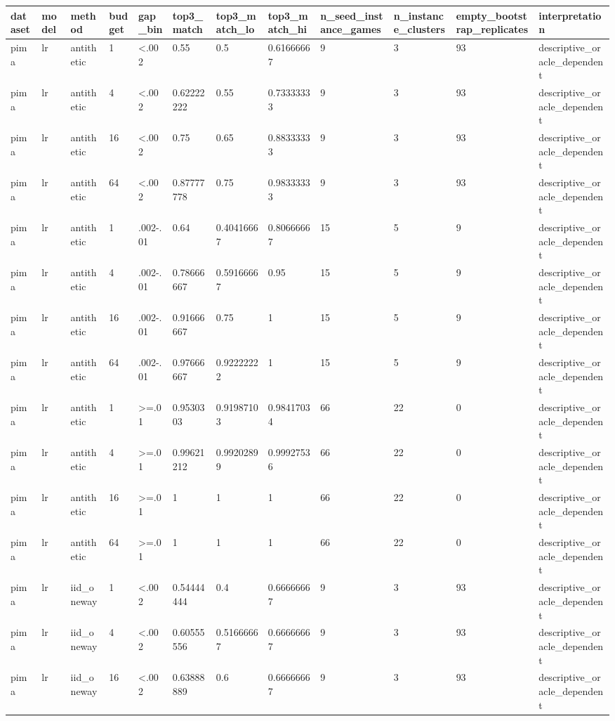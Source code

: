 \begin{tabular}{llllllllllll}
\toprule
dataset & model & method & budget & gap\_bin & top3\_match & top3\_match\_lo & top3\_match\_hi & n\_seed\_instance\_games & n\_instance\_clusters & empty\_bootstrap\_replicates & interpretation \\
\midrule
pima & lr & antithetic & 1 & <.002 & 0.55 & 0.5 & 0.61666667 & 9 & 3 & 93 & descriptive\_oracle\_dependent \\
pima & lr & antithetic & 4 & <.002 & 0.62222222 & 0.55 & 0.73333333 & 9 & 3 & 93 & descriptive\_oracle\_dependent \\
pima & lr & antithetic & 16 & <.002 & 0.75 & 0.65 & 0.88333333 & 9 & 3 & 93 & descriptive\_oracle\_dependent \\
pima & lr & antithetic & 64 & <.002 & 0.87777778 & 0.75 & 0.98333333 & 9 & 3 & 93 & descriptive\_oracle\_dependent \\
pima & lr & antithetic & 1 & .002-.01 & 0.64 & 0.40416667 & 0.80666667 & 15 & 5 & 9 & descriptive\_oracle\_dependent \\
pima & lr & antithetic & 4 & .002-.01 & 0.78666667 & 0.59166667 & 0.95 & 15 & 5 & 9 & descriptive\_oracle\_dependent \\
pima & lr & antithetic & 16 & .002-.01 & 0.91666667 & 0.75 & 1 & 15 & 5 & 9 & descriptive\_oracle\_dependent \\
pima & lr & antithetic & 64 & .002-.01 & 0.97666667 & 0.92222222 & 1 & 15 & 5 & 9 & descriptive\_oracle\_dependent \\
pima & lr & antithetic & 1 & >=.01 & 0.9530303 & 0.91987103 & 0.98417034 & 66 & 22 & 0 & descriptive\_oracle\_dependent \\
pima & lr & antithetic & 4 & >=.01 & 0.99621212 & 0.99202899 & 0.99927536 & 66 & 22 & 0 & descriptive\_oracle\_dependent \\
pima & lr & antithetic & 16 & >=.01 & 1 & 1 & 1 & 66 & 22 & 0 & descriptive\_oracle\_dependent \\
pima & lr & antithetic & 64 & >=.01 & 1 & 1 & 1 & 66 & 22 & 0 & descriptive\_oracle\_dependent \\
pima & lr & iid\_oneway & 1 & <.002 & 0.54444444 & 0.4 & 0.66666667 & 9 & 3 & 93 & descriptive\_oracle\_dependent \\
pima & lr & iid\_oneway & 4 & <.002 & 0.60555556 & 0.51666667 & 0.66666667 & 9 & 3 & 93 & descriptive\_oracle\_dependent \\
pima & lr & iid\_oneway & 16 & <.002 & 0.63888889 & 0.6 & 0.66666667 & 9 & 3 & 93 & descriptive\_oracle\_dependent \\

\end{tabular}
